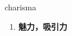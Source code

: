 
\begin{frame}
{\huge charisma}
\begin{center}
\begin{enumerate}\Large
  \item \textbf{魅力，吸引力}
\end{enumerate}
\end{center}
\end{frame}
